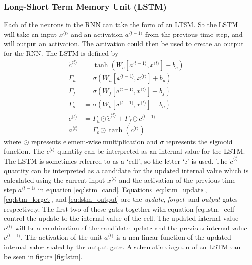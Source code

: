 \documentclass[a4paper,12pt]{article}
\theoremstyle{definition}
\begin{document}
\subsubsection{Long-Short Term Memory Unit (LSTM)}\label{sec:lstm}
Each of the neurons in the RNN can take the form of an LTSM. So the LSTM will take an input $x^{\langle t \rangle}$ and an activation $a^{\langle t-1 \rangle}$ from the previous time step, and will output an activation. The activation could then be used to create an output for the RNN. The LSTM is defined by
\begin{align}
	\tilde{c}^{\langle t \rangle} &= \tanh(W_c[a^{\langle t-1 \rangle}, x^{\langle t \rangle}] + b_c) \label{eq:lstm_cand} \\
	\Gamma_u &= \sigma(W_u[a^{\langle t-1 \rangle}, x^{\langle t \rangle}] + b_u) \label{eq:lstm_update} \\
	\Gamma_f &= \sigma(W_f[a^{\langle t-1 \rangle}, x^{\langle t \rangle}] + b_f) \label{eq:lstm_forget} \\
	\Gamma_o &= \sigma(W_o[a^{\langle t-1 \rangle}, x^{\langle t \rangle}] + b_o) \label{eq:lstm_output} \\
	c^{\langle t \rangle} &= \Gamma_u \odot \tilde{c}^{\langle t \rangle} + \Gamma_f \odot c^{\langle t-1 \rangle} \label{eq:lstm_cell} \\
	a^{\langle t \rangle} &= \Gamma_o \odot \tanh( c^{\langle t \rangle}) \label{eq:lstm_act}
\end{align}
where $\odot$ represents element-wise multiplication and $\sigma$ represents the sigmoid function. The $c^{\langle t \rangle}$ quantity can be interpreted as an internal value for the LSTM. The LSTM is sometimes referred to as a `cell', so the letter `c' is used. The $\tilde{c}^{\langle t \rangle}$ quantity can be interpreted as a candidate for the updated internal value which is calculated using the current input $x^{\langle t \rangle}$ and the activation of the previous time-step $a^{\langle t-1 \rangle}$ in equation \ref{eq:lstm_cand}. Equations \ref{eq:lstm_update}, \ref{eq:lstm_forget}, and \ref{eq:lstm_output} are the \textit{update}, \textit{forget}, and \textit{output} gates respectively. The first two of these gates together with equation \ref{eq:lstm_cell} control the update to the internal value of the cell. The updated internal value $c^{\langle t \rangle}$ will be a combination of the candidate update and the previous internal value $c^{\langle t-1 \rangle}$. The activation of the unit $a^{\langle t \rangle}$ is a non-linear function of the updated internal value scaled by the output gate. A schematic diagram of an LSTM can be seen in figure \ref{fig:lstm}.
\end{document}
